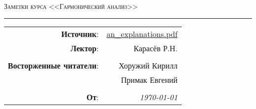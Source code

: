 
\begin{center}
    \LARGE \textsc{Заметки курса <<Гармонический анализ>>}
\end{center}

\hrule

\phantom{42}

\begin{flushright}
    \begin{tabular}{rr}
        \textbf{Источник}: 
        & \href{http://rkarasev.ru/common/upload/an_explanations.pdf}{an\_explanations.pdf} \\
        \textbf{Лектор}: 
        & Карасёв Р.Н. \\
        &\\
        \textbf{Восторженные читатели}: 
        & Хоружий Кирилл \\
        & Примак Евгений \\
        &\\
        \textbf{От}: &
        \textit{\today}\\
    \end{tabular}
\end{flushright}

\thispagestyle{empty}
\tableofcontents
\newpage